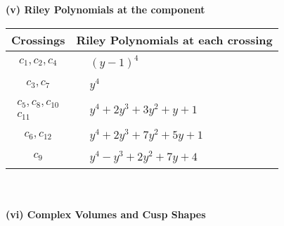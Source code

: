 \documentclass[1p]{elsarticle_modified}
\theoremstyle{definition}
\begin{document}
\newpage\renewcommand{\arraystretch}{1}
\flushleft \textbf{(v) Riley Polynomials at the component}\newline \\
\begin{tabular}{m{50pt}|m{274pt}}
Crossings & \hspace{64pt}Riley Polynomials at each crossing \\
\hline $$\begin{aligned}c_{1},c_{2},c_{4}\end{aligned}$$&$\begin{aligned}
&(y-1)^4
\end{aligned}$\\
\hline $$\begin{aligned}c_{3},c_{7}\end{aligned}$$&$\begin{aligned}
&y^4
\end{aligned}$\\
\hline $$\begin{aligned}c_{5},c_{8},c_{10}\\c_{11}\end{aligned}$$&$\begin{aligned}
&y^4+2 y^3+3 y^2+y+1
\end{aligned}$\\
\hline $$\begin{aligned}c_{6},c_{12}\end{aligned}$$&$\begin{aligned}
&y^4+2 y^3+7 y^2+5 y+1
\end{aligned}$\\
\hline $$\begin{aligned}c_{9}\end{aligned}$$&$\begin{aligned}
&y^4- y^3+2 y^2+7 y+4
\end{aligned}$\\
\hline
\end{tabular}\\~\\
\newpage\flushleft \textbf{(vi) Complex Volumes and Cusp Shapes}
\end{document}

